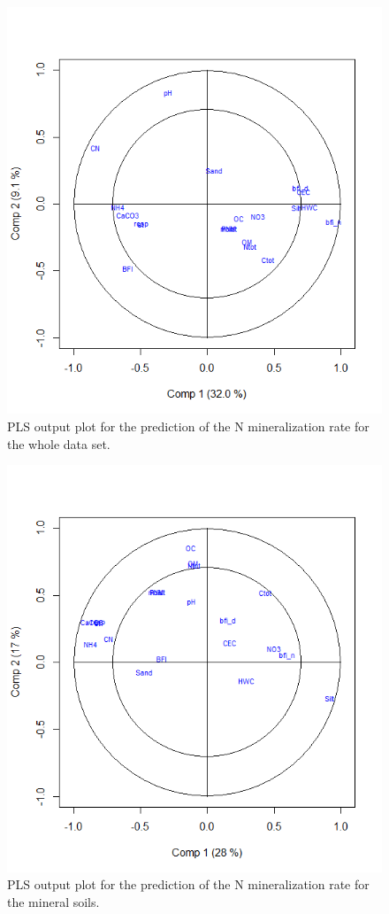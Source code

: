 \documentclass[10pt,twoside,dutch,english]{report}
\begin{document}
\begin{appendices}
\begin{figure}[H]
		\centering
		\includegraphics[width=0.6\linewidth]{app_pls_tot}
		\caption{PLS output plot for the prediction of the N mineralization rate for the whole data set.}
		\end{figure}
        
        \begin{figure}[H] %
		
		\centering
		\includegraphics[width=0.6\linewidth]{app_pls_min}
		\caption{PLS output plot for the prediction of the N mineralization rate for the mineral soils.}
		\end{figure}
        
        \begin{figure}[H] %
		

\end{figure}
\end{appendices}
\end{document}
